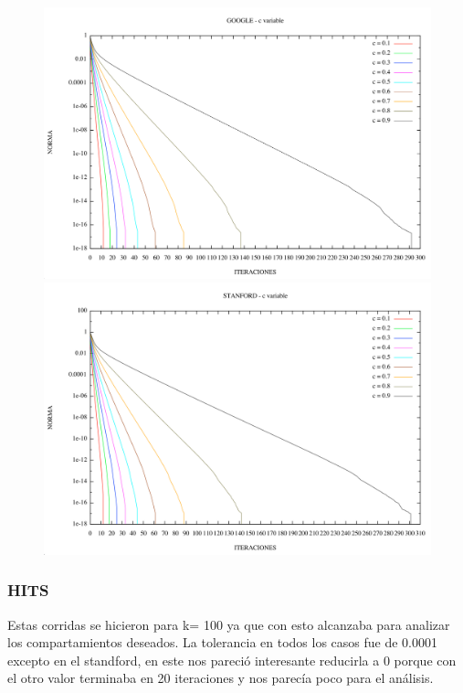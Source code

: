 \begin{figure}
\begin{center}
    \includegraphics[scale=0.5]{imagenes/pagerank_google_norma.png}
  \includegraphics[scale=0.5]{imagenes/pagerank_stanford_norma.png}
    \end{center}
\end{figure}

\FloatBarrier




\subsubsection {HITS}


Estas corridas se hicieron para k= 100 ya que con esto alcanzaba para analizar los compartamientos deseados. La tolerancia en todos los casos fue de 0.0001 excepto en el standford, en este nos pareció interesante reducirla a 0 porque con el otro valor terminaba en 20 iteraciones y nos parecía poco para el análisis.

